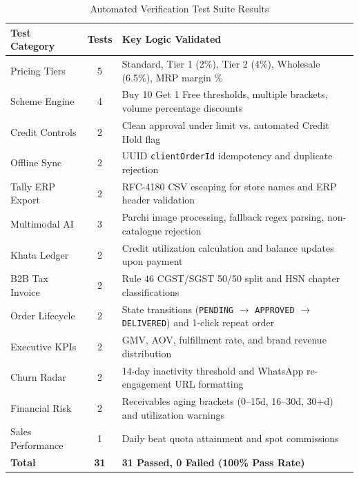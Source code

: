 \documentclass[11pt,a4paper]{article}
\begin{document}
\begin{table}[h!]
\centering
\small
\begin{tabularx}{\textwidth}{l c X}
\toprule
\textbf{Test Category} & \textbf{Tests} & \textbf{Key Logic Validated} \\
\midrule
Pricing Tiers & 5 & Standard, Tier 1 (2\%), Tier 2 (4\%), Wholesale (6.5\%), MRP margin \% \\
Scheme Engine & 4 & Buy 10 Get 1 Free thresholds, multiple brackets, volume percentage discounts \\
Credit Controls & 2 & Clean approval under limit vs. automated Credit Hold flag \\
Offline Sync & 2 & UUID \texttt{clientOrderId} idempotency and duplicate rejection \\
Tally ERP Export & 2 & RFC-4180 CSV escaping for store names and ERP header validation \\
Multimodal AI & 3 & Parchi image processing, fallback regex parsing, non-catalogue rejection \\
Khata Ledger & 2 & Credit utilization calculation and balance updates upon payment \\
B2B Tax Invoice & 2 & Rule 46 CGST/SGST 50/50 split and HSN chapter classifications \\
Order Lifecycle & 2 & State transitions (\texttt{PENDING} $\rightarrow$ \texttt{APPROVED} $\rightarrow$ \texttt{DELIVERED}) and 1-click repeat order \\
Executive KPIs & 2 & GMV, AOV, fulfillment rate, and brand revenue distribution \\
Churn Radar & 2 & 14-day inactivity threshold and WhatsApp re-engagement URL formatting \\
Financial Risk & 2 & Receivables aging brackets (0--15d, 16--30d, 30+d) and utilization warnings \\
Sales Performance & 1 & Daily beat quota attainment and spot commissions \\
\midrule
\textbf{Total} & \textbf{31} & \textbf{31 Passed, 0 Failed (100\% Pass Rate)} \\
\bottomrule
\end{tabularx}
\caption{Automated Verification Test Suite Results}
\end{table}
\end{document}
